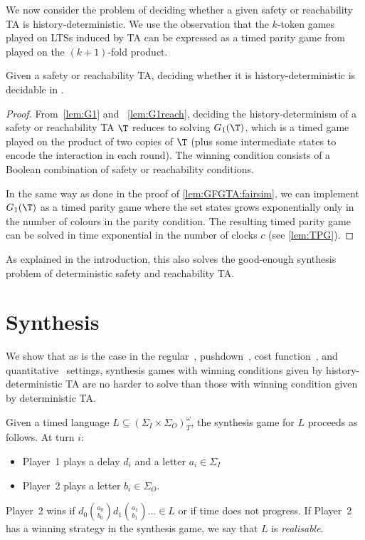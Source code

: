 We now consider the problem of deciding whether a given safety or reachability TA
is history-deterministic. We use the observation that
the $k$-token games played on LTSs induced by TA can be expressed as a timed parity game from~\cite{CHP08} played on the $(k+1)$-fold product.


\begin{theorem}\label{thm:decidable}
Given a safety or reachability TA, deciding whether it is history-deterministic is decidable in \exptime.
\end{theorem}
\begin{proof}
From~\cref{lem:G1} and ~\cref{lem:G1reach}, deciding the history-determinism of a safety or reachability TA $\T$ reduces to solving $G_1(\T)$, which is a timed game played on the product of two copies of $\T$ (plus some intermediate states to encode the interaction in each round). The winning condition consists of a Boolean combination of safety or reachability conditions.

In the same way as done in the proof of \cref{lem:GFGTA:fairsim}, we can implement $G_1(\T)$ as a timed parity
game where the set states grows exponentially only in the number of colours in the parity condition.
The resulting timed parity game can be solved in time exponential in the number of clocks $c$ (see
\cref{lem:TPG}).
\end{proof}

As explained in the introduction, this also solves the good-enough synthesis problem of deterministic safety and reachability TA.
	
	
	\section{Synthesis}
	\label{sec_synthesis}
	\label{sec:synthesis}
We show that as is the case in the regular~\cite{HP06}, pushdown~\cite{LZ22}, cost function~\cite{Col09}, and quantitative~\cite{BL21} settings, synthesis games with winning conditions given by history-deterministic TA are no harder to solve than those with winning condition given by deterministic TA.


\begin{definition}
	Given a timed language $L\subseteq (\Sigma_I\times \Sigma_O)^\omega_T$, the synthesis game for $L$ proceeds as follows.
	At turn $i$:
	\begin{itemize}
		\item Player~1 plays a delay $d_i$ and a letter $a_i\in \Sigma_I$
		\item Player~2 plays a letter $b_i\in \Sigma_O$.
	\end{itemize}
	Player~2 wins if $d_0\binom{a_0}{b_0}d_1\binom{a_1}{b_1}...\in L$ or if time does not progress.
If Player~2 has a winning strategy in the synthesis game, we say that $L$ is \emph{realisable}.
\end{definition}



